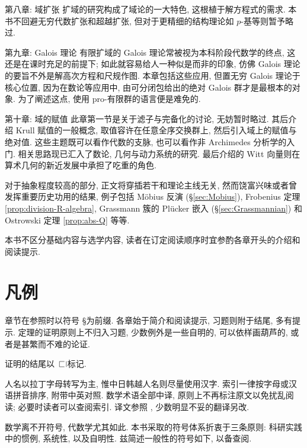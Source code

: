 \begin{asparadesc}
	\item[第八章: 域扩张] 扩域的研究构成了域论的一大特色, 这根植于解方程式的需求. 本书不回避无穷代数扩张和超越扩张, 但对于更精细的结构理论如 $p$-基等则暂予略过.
	
	\item[第九章: Galois 理论] 有限扩域的 Galois 理论常被视为本科阶段代数学的终点, 这还是在课时充足的前提下; 如此就容易给人一种似是而非的印象, 仿佛 Galois 理论的要旨不外是解高次方程和尺规作图. 本章包括这些应用, 但置无穷 Galois 理论于核心位置, 因为在数论等应用中, 由可分闭包给出的绝对 Galois 群才是最根本的对象. 为了阐述这点, 使用 pro-有限群的语言便是难免的.

	\item[第十章: 域的赋值] 此章第一节是关于滤子与完备化的讨论, 无妨暂时略过. 其后介绍 Krull 赋值的一般概念, 取值容许在任意全序交换群上, 然后引入域上的赋值与绝对值. 这些主题既可以看作代数的支脉, 也可以看作非 Archimedes 分析学的入门. 相关思路现已汇入了数论, 几何与动力系统的研究. 最后介绍的 Witt 向量则在算术几何的新近发展中承担了吃重的角色.
\end{asparadesc}

对于抽象程度较高的部分, 正文将穿插若干和理论主线无关, 然而饶富兴味或者曾发挥重要历史功用的结果, 例子包括 Möbius 反演 (\S\ref{sec:Mobius}), Frobenius 定理 \ref{prop:division-R-algebra}, Grassmann 簇的 Plücker 嵌入 (\S\ref{sec:Grassmannian}) 和 Ostrowski 定理 \ref{prop:abs-Q} 等等.

本书不区分基础内容与选学内容, 读者在订定阅读顺序时宜参酌各章开头的介绍和阅读提示.

\section*{凡例}
章节在参照时以符号 \S 为前缀. 各章始于简介和阅读提示, 习题则附于结尾, 多有提示. 定理的证明原则上不归入习题, 少数例外是一些自明的, 可以依样画葫芦的, 或者是甚繁而不难的论证.

证明的结尾以 $\openbox$ 标记.

人名以拉丁字母转写为主, 惟中日韩越人名则尽量使用汉字. 索引一律按字母或汉语拼音排序, 附带中英对照. 数学术语全部中译, 原则上不再标注原文以免扰乱阅读; 必要时读者可以查阅索引. 译文参照 \cite{ZG}, 少数明显不妥的翻译另改.

数学离不开符号, 代数学尤其如此. 本书采取的符号体系折衷于三条原则: 科研实践中的惯例, 系统性, 以及自明性. 兹简述一般性的符号如下, 以备查阅.

